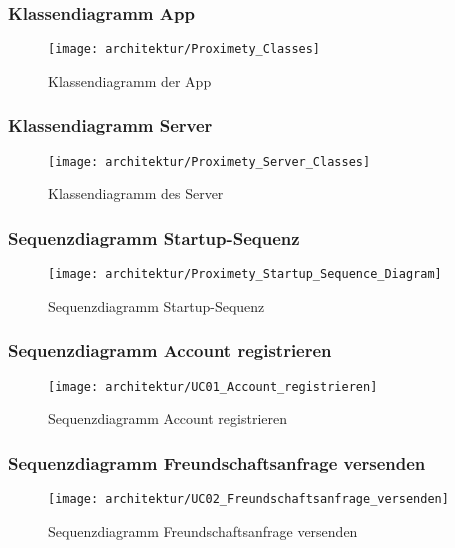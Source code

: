 \subsubsection{Klassendiagramm App}
\begin{figure}[H]
	\centering
		\texttt{[image: architektur/Proximety\_Classes]}
	\caption{Klassendiagramm der App}
	\label{fig:Proximety_Classes}
\end{figure}
\FloatBarrier



\pagebreak
\subsubsection{Klassendiagramm Server}
\begin{figure}[H]
	\centering
		\texttt{[image: architektur/Proximety\_Server\_Classes]}
	\caption{Klassendiagramm des Server}
	\label{fig:Proximety_Server_Classes}
\end{figure}
\FloatBarrier



\pagebreak
\subsubsection{Sequenzdiagramm Startup-Sequenz}
\begin{figure}[H]
	\centering
		\texttt{[image: architektur/Proximety\_Startup\_Sequence\_Diagram]}
	\caption{Sequenzdiagramm Startup-Sequenz}
	\label{fig:Proximety_Startup_Sequence_Diagram}
\end{figure}
\FloatBarrier



\pagebreak
\subsubsection{Sequenzdiagramm Account registrieren}
\begin{figure}[H]
	\centering
		\texttt{[image: architektur/UC01\_Account\_registrieren]}
	\caption{Sequenzdiagramm Account registrieren}
	\label{fig:UC01_Account_registrieren}
\end{figure}
\FloatBarrier



\pagebreak
\subsubsection{Sequenzdiagramm Freundschaftsanfrage versenden}
\begin{figure}[H]
	\centering
		\texttt{[image: architektur/UC02\_Freundschaftsanfrage\_versenden]}
	\caption{Sequenzdiagramm Freundschaftsanfrage versenden}
	\label{fig:UC02_Freundschaftsanfrage_versenden}
\end{figure}
\FloatBarrier



